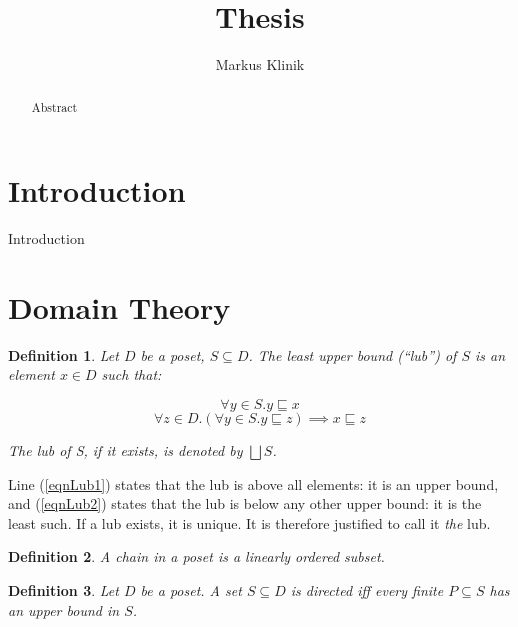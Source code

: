 \documentclass[a4paper]{article}
\newcommand{\below}{\sqsubseteq}
\newcommand{\lub}{\bigsqcup}
\newtheorem{definition}{Definition}[section]
\begin{document}
\title{Thesis}
\author{Markus Klinik}
\maketitle

\begin{abstract}

Abstract

\end{abstract}

\section{Introduction}

Introduction

\section{Domain Theory}

\begin{definition}

Let $D$ be a poset, $S \subseteq D$. The \emph{least upper bound} (``lub'') of $S$
is an element $x \in D$ such that:

\begin{equation} \label{eqnLub1}
\forall y \in S . y \below x
\end{equation}
\begin{equation} \label{eqnLub2}
\forall z \in D . (\forall y \in S . y \below z) \implies x \below z
\end{equation}

The lub of S, if it exists, is denoted by $\lub S$.

\end{definition}

Line (\ref{eqnLub1}) states that the lub is above all elements: it is an upper
bound, and (\ref{eqnLub2}) states that the lub is below any other upper bound:
it is the least such. If a lub exists, it is unique. It is therefore justified
to call it \emph{the} lub.


\begin{definition}

A \emph{chain} in a poset is a linearly ordered subset.

\end{definition}


\begin{definition}

Let $D$ be a poset. A set $S \subseteq D$ is \emph{directed} iff every finite
$P \subseteq S$ has an upper bound in $S$.

\end{definition}
\end{document}
